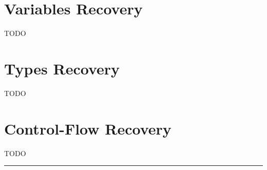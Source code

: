 \section{Variables Recovery} \label{sec:challenges-variable}
TODO

\section{Types Recovery} \label{sec:challenges-types}
TODO

\section{Control-Flow Recovery} \label{sec:challenges-control-flow}
TODO

\noindent\rule{8cm}{0.4pt}

\newpage
